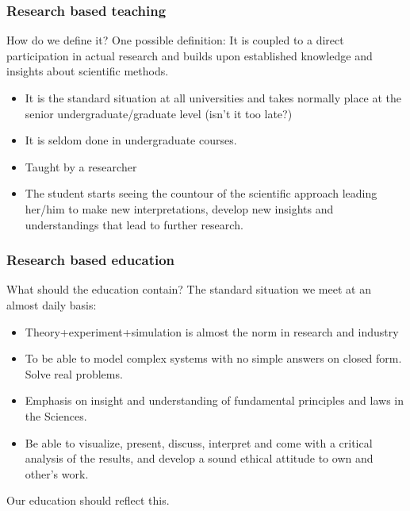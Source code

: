 \documentclass{beamer}
\begin{document}
\begin{frame}
\frametitle{Research based teaching}

\begin{block}{How do we define it? }
One possible definition: It is coupled to a direct participation in actual research and builds upon established
knowledge and insights about scientific methods.


\begin{itemize}
\item It is the standard situation at all universities  and takes normally place at the senior undergraduate/graduate level (isn't it too late?)

\item It is seldom done in undergraduate courses.

\item Taught by a researcher

\item The student starts seeing the countour of the scientific approach leading her/him to make new interpretations, develop new insights and understandings that lead  to further research.
\end{itemize}

\noindent
\end{block}
\end{frame}

\begin{frame}
\frametitle{Research based education}

\begin{block}{What should the education contain? }
The standard situation we meet at an almost daily basis:

\begin{itemize}
\item Theory+experiment+simulation is almost the norm in research and industry

\item To be able to model complex systems with no simple answers on closed form. Solve real problems.

\item Emphasis on insight and understanding of fundamental principles and laws in the Sciences.

\item Be able to visualize, present, discuss, interpret and come with a critical analysis of the results, and develop a sound ethical attitude to own and other's work.
\end{itemize}

\noindent
Our education should reflect this.
\end{block}
\end{frame}
\end{document}
